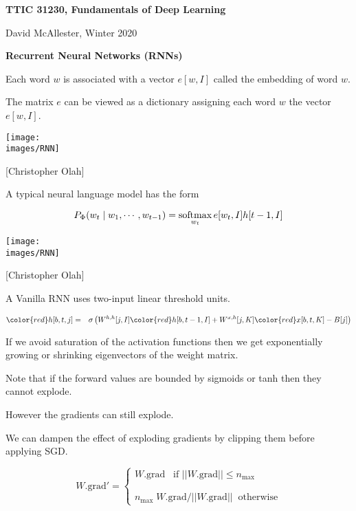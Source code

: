 




{\Huge

  \centerline{\bf TTIC 31230, Fundamentals of Deep Learning}
  \bigskip
  \centerline{David McAllester, Winter 2020}
  \vfill
  \centerline{\bf Recurrent Neural Networks (RNNs)}


Each word $w$ is associated with a vector $e[w,I]$ called the embedding of word $w$.

\vfill
The matrix $e$ can be viewed as a dictionary assigning each word $w$ the vector $e[w,I]$.


\centerline{\texttt{[image: \\images/RNN]}}
\centerline{{\large [Christopher Olah]}}

\vfill
A typical neural language model has the form

$$P_\Phi(w_t\;|\;w_1,\cdots,w_{t-1}) = \operatorname*{softmax}_{w_t} e[w_t,I]h[t-1,I]$$


\centerline{\texttt{[image: \\images/RNN]}}
\centerline{{\large [Christopher Olah]}}

A Vanilla RNN uses two-input linear threshold units.

{\huge
\begin{eqnarray*}
{\color{red} h[b,t,j]}
& = & \sigma\left(W^{h,h}[j,I]{\color{red} h[b,t-1,I]} + W^{x,h}[j,K]{\color{red} x[b,t,K]} - B[j]\right) \\
\end{eqnarray*}
}


\vfill
If we avoid saturation of the activation functions then we get exponentially growing or shrinking eigenvectors of the weight matrix.

\vfill
Note that if the forward values are bounded by sigmoids or tanh then they cannot explode.

\vfill
However the gradients can still explode.


\vfill
We can dampen the effect of exploding gradients by clipping them before applying SGD.

\vfill
$$W.\mathrm{grad'} = \left\{\begin{array}{l} W.\mathrm{grad} \;\;\;\mbox{if $||W.\mathrm{grad}|| \leq n_{\mathrm{max}}$} \\
                                                      \\ \\
                                                      n_{\mathrm{max}} \; W.\mathrm{grad} / ||W.\mathrm{grad}|| \;\; \mbox{otherwise}
\end{array} \right.$$

}
